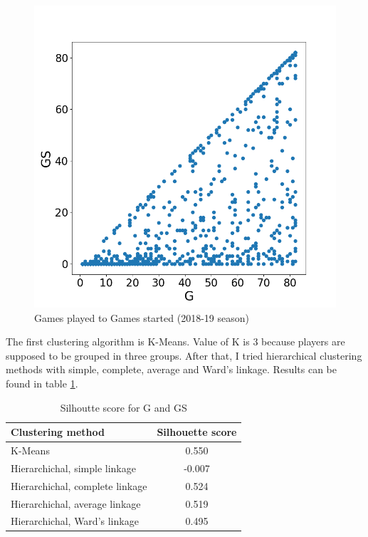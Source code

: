 \documentclass[a4paper]{article}
\begin{document}
\begin{figure}[h!]
\begin{center}
\includegraphics[scale=0.3]{g_to_gs.png}
\end{center}
\caption{Games played to Games started (2018-19 season)}
\label{plt:g_gs}
\end{figure}

The first clustering algorithm is K-Means. Value of K is 3 because players are supposed to be grouped in three groups. After that, I tried hierarchical clustering methods with simple, complete, average and Ward's linkage. Results can be found in table \ref{tab:clust_score_k3}.

\begin{table}[!h]
\begin{center}
\begin{tabular}{|l|c|} \hline
\textbf{Clustering method} & \textbf{Silhouette score}  \\ \hline
K-Means & 0.550  \\ \hline
Hierarchichal, simple linkage & -0.007  \\ \hline
Hierarchichal, complete linkage & 0.524  \\ \hline
Hierarchichal, average linkage &  0.519  \\ \hline
Hierarchichal, Ward's linkage & 0.495  \\ \hline
\end{tabular}
\caption{Silhoutte score for G and GS}
\label{tab:clust_score_k3}
\end{center}
\end{table}
\end{document}
